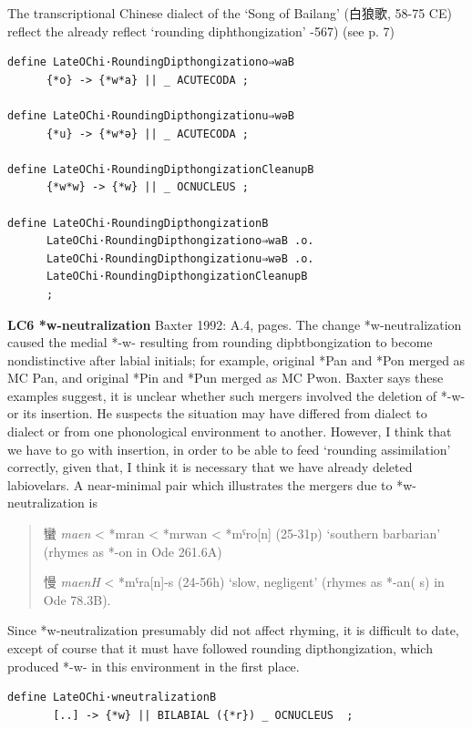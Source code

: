 \documentclass[xetex, svgnames, 12pt]{scrartcl}
\newcounter{para}
\newcommand\mypara[1]{\par\refstepcounter{para}\textbf{\thepara\space#1\space}}
\begin{document}
The transcriptional Chinese dialect of the `Song of Bailang' (白狼歌, 58-75 CE) reflect the already reflect `rounding diphthongization' \citep[566]{Baxter1992}-567) \citep{Hill2017Bailang}
 (see p. 7)


\begin{verbatim}
define LateOChi·RoundingDipthongizationo⇒waB 
      {*o} -> {*w*a} || _ ACUTECODA ;

define LateOChi·RoundingDipthongizationu⇒wəB 
      {*u} -> {*w*ə} || _ ACUTECODA ;

define LateOChi·RoundingDipthongizationCleanupB 
      {*w*w} -> {*w} || _ OCNUCLEUS ; 

define LateOChi·RoundingDipthongizationB
      LateOChi·RoundingDipthongizationo⇒waB .o.
      LateOChi·RoundingDipthongizationu⇒wəB .o.
      LateOChi·RoundingDipthongizationCleanupB
      ;
\end{verbatim} 

\mypara{LC6 *w-neutralization}
Baxter 1992: A.4, pages.  
 The change *w-neutralization caused the medial *-w- resulting from 
 rounding dipbtbongization to become nondistinctive after labial initials; 
 for example, original *Pan and *Pon merged as MC Pan, and original *Pin 
 and *Pun merged as MC Pwon. Baxter says these examples suggest, it is unclear whether 
 such mergers involved the deletion of *-w- or its insertion. He suspects the situation 
 may have differed from dialect to dialect or from one phonological environment
 to another. However, I think that we have to go with insertion, in order to be 
 able to feed `rounding assimilation' correctly, given that, I think it is necessary
 that we have already deleted labiovelars.
 A near-minimal pair which illustrates the mergers due to 
 *w-neutralization is
 \begin{quote}
 蠻 %
 \textit{maen} < *mran < *mrwan < *mˤro[n] (25-31p) `southern barbarian' 
 (rhymes as *-on in Ode 261.6A)
 
 慢 
 \textit{maenH} < *mˤra[n]-s (24-56h) `slow, negligent' 
 (rhymes as *-an( s) in Ode 78.3B).
  \end{quote}
 Since *w-neutralization presumably did not affect rhyming, 
 it is difficult to date, except of course that it must have followed 
 rounding dipthongization, which produced *-w- in
 this environment in the first place.
\begin{verbatim}
define LateOChi·wneutralizationB 
       [..] -> {*w} || BILABIAL ({*r}) _ OCNUCLEUS  ;
\end{verbatim}
\end{document}
